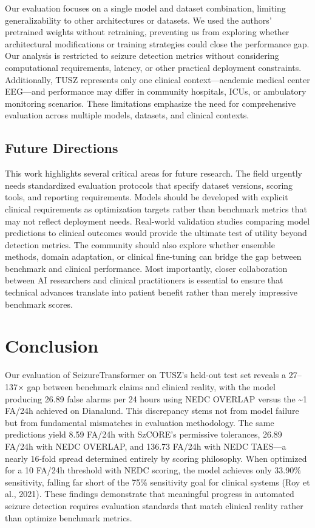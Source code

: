 \documentclass[
  10pt,
]{article}
\begin{document}
Our evaluation focuses on a single model and dataset combination,
limiting generalizability to other architectures or datasets. We used
the authors' pretrained weights without retraining, preventing us from
exploring whether architectural modifications or training strategies
could close the performance gap. Our analysis is restricted to seizure
detection metrics without considering computational requirements,
latency, or other practical deployment constraints. Additionally, TUSZ
represents only one clinical context---academic medical center EEG---and
performance may differ in community hospitals, ICUs, or ambulatory
monitoring scenarios. These limitations emphasize the need for
comprehensive evaluation across multiple models, datasets, and clinical
contexts.

\hypertarget{future-directions}{%
\subsection{Future Directions}\label{future-directions}}

This work highlights several critical areas for future research. The
field urgently needs standardized evaluation protocols that specify
dataset versions, scoring tools, and reporting requirements. Models
should be developed with explicit clinical requirements as optimization
targets rather than benchmark metrics that may not reflect deployment
needs. Real-world validation studies comparing model predictions to
clinical outcomes would provide the ultimate test of utility beyond
detection metrics. The community should also explore whether ensemble
methods, domain adaptation, or clinical fine-tuning can bridge the gap
between benchmark and clinical performance. Most importantly, closer
collaboration between AI researchers and clinical practitioners is
essential to ensure that technical advances translate into patient
benefit rather than merely impressive benchmark scores.



\hypertarget{conclusion}{%
\section{Conclusion}\label{conclusion}}

Our evaluation of SeizureTransformer on TUSZ's held-out test set reveals
a 27--137× gap between benchmark claims and clinical reality, with the
model producing 26.89 false alarms per 24 hours using NEDC OVERLAP
versus the \textasciitilde1 FA/24h achieved on Dianalund. This
discrepancy stems not from model failure but from fundamental mismatches
in evaluation methodology. The same predictions yield 8.59 FA/24h with
SzCORE's permissive tolerances, 26.89 FA/24h with NEDC OVERLAP, and
136.73 FA/24h with NEDC TAES---a nearly 16-fold spread determined
entirely by scoring philosophy. When optimized for a 10 FA/24h threshold
with NEDC scoring, the model achieves only 33.90\% sensitivity, falling
far short of the 75\% sensitivity goal for clinical systems (Roy et al.,
2021). These findings demonstrate that meaningful progress in automated
seizure detection requires evaluation standards that match clinical
reality rather than optimize benchmark metrics.
\end{document}
